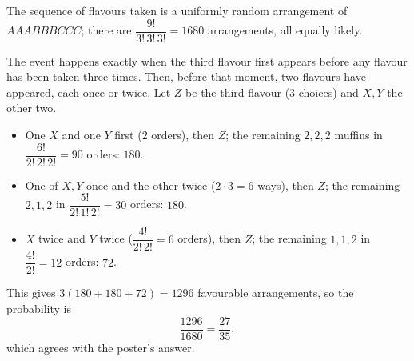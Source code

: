 The sequence of flavours taken is a uniformly random arrangement of $AAABBBCCC$; there are $\dfrac{9!}{3!\,3!\,3!}=1680$ arrangements, all equally likely.

The event happens exactly when the third flavour first appears before any flavour has been taken three times. Then, before that moment, two flavours have appeared, each once or twice. Let $Z$ be the third flavour ($3$ choices) and $X,Y$ the other two.
\begin{itemize}
\item One $X$ and one $Y$ first ($2$ orders), then $Z$; the remaining $2,2,2$ muffins in $\dfrac{6!}{2!\,2!\,2!}=90$ orders: $180$.
\item One of $X,Y$ once and the other twice ($2\cdot3=6$ ways), then $Z$; the remaining $2,1,2$ in $\dfrac{5!}{2!\,1!\,2!}=30$ orders: $180$.
\item $X$ twice and $Y$ twice ($\dfrac{4!}{2!\,2!}=6$ orders), then $Z$; the remaining $1,1,2$ in $\dfrac{4!}{2!}=12$ orders: $72$.
\end{itemize}
This gives $3(180+180+72)=1296$ favourable arrangements, so the probability is
\[\dfrac{1296}{1680}=\boxed{\dfrac{27}{35}},\]
which agrees with the poster's answer.
